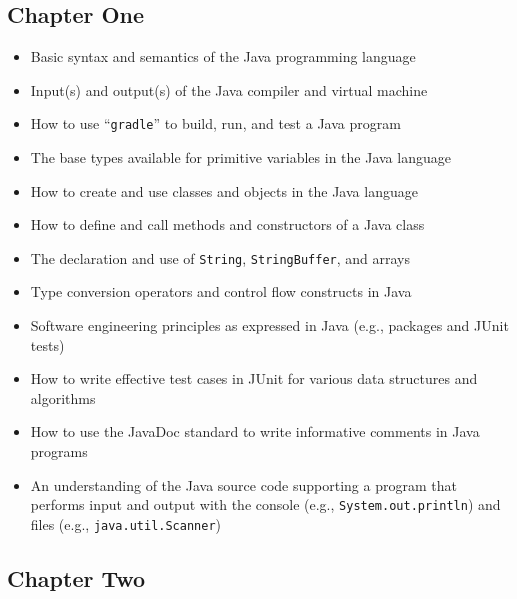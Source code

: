 \documentclass[11pt]{article}
\newcommand{\command}[1]{``\lstinline{#1}''}
\newcommand{\program}[1]{\lstinline{#1}}
\begin{document}
\subsection*{Chapter One}

\begin{itemize}

  \item Basic syntax and semantics of the Java programming language
  \item Input(s) and output(s) of the Java compiler and virtual machine
  \item How to use \command{gradle} to build, run, and test a Java program
  \item The base types available for primitive variables in the Java language
  \item How to create and use classes and objects in the Java language
  \item How to define and call methods and constructors of a Java class
  \item The declaration and use of \program{String}, \program{StringBuffer}, and arrays
  \item Type conversion operators and control flow constructs in Java
  \item Software engineering principles as expressed in Java (e.g., packages and
    JUnit tests)
  \item How to write effective test cases in JUnit for various data structures
    and algorithms
  \item How to use the JavaDoc standard to write informative
    comments in Java programs
  \item An understanding of the Java source code supporting a program that
    performs input and output with the console (e.g.,
    \program{System.out.println}) and files (e.g., \program{java.util.Scanner})

\end{itemize}

\vspace*{-.2in}
\subsection*{Chapter Two}
\end{document}
